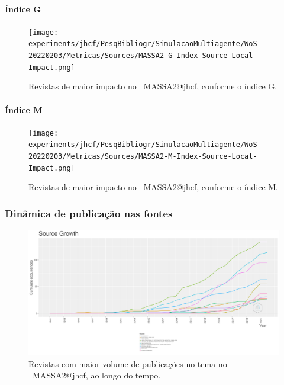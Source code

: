\paragraph{Índice G}

\begin{figure}
    \centering
    \texttt{[image: experiments/jhcf/PesqBibliogr/SimulacaoMultiagente/WoS-20220203/Metricas/Sources/MASSA2-G-Index-Source-Local-Impact.png]}
    \caption{Revistas de maior impacto no  \dataset\ MASSA2@jhcf,  conforme o índice G.}
    \label{fig:MASSA2-G-Index-Source-Local-Impact.png}
\end{figure}

\paragraph{Índice M}

\begin{figure}
    \centering
    \texttt{[image: experiments/jhcf/PesqBibliogr/SimulacaoMultiagente/WoS-20220203/Metricas/Sources/MASSA2-M-Index-Source-Local-Impact.png]}
    \caption{Revistas de maior impacto no  \dataset\ MASSA2@jhcf,  conforme o índice M.}
    \label{fig:MASSA2-M-Index-Source-Local-Impact.png}
\end{figure}

\subsubsection{Dinâmica de publicação nas fontes}

\begin{figure}
    \centering
    \includegraphics[width=1\textwidth]{experiments/jhcf/PesqBibliogr/SimulacaoMultiagente/WoS-20220203/Metricas/Sources/MASSA2-Source-Dynamics.png}
    \caption{Revistas com maior volume de publicações no tema no  \dataset\ MASSA2@jhcf, ao longo do tempo.}
    \label{fig:MASSA2-Source-Dynamics.png}
\end{figure}

